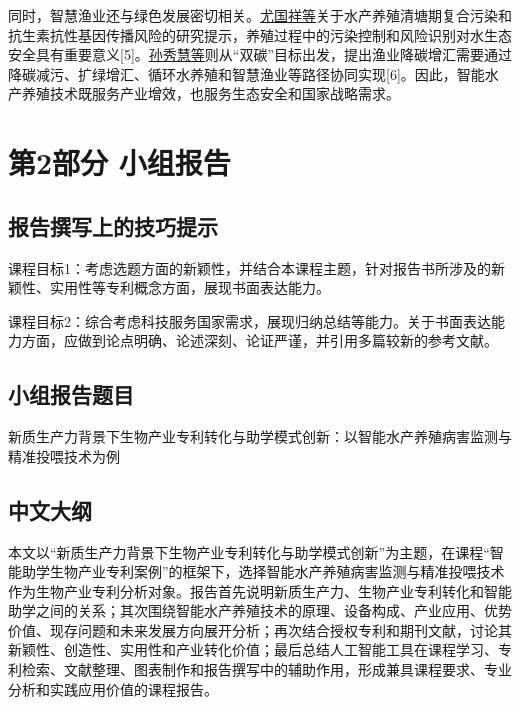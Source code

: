 \documentclass[UTF8,zihao=-4]{ctexart}
\begin{document}
	同时，智慧渔业还与绿色发展密切相关。\href{https://kns.cnki.net/}{尤国祥等}关于水产养殖清塘期复合污染和抗生素抗性基因传播风险的研究提示，养殖过程中的污染控制和风险识别对水生态安全具有重要意义[5]。\href{https://kns.cnki.net/}{孙秀慧等}则从“双碳”目标出发，提出渔业降碳增汇需要通过降碳减污、扩绿增汇、循环水养殖和智慧渔业等路径协同实现[6]。因此，智能水产养殖技术既服务产业增效，也服务生态安全和国家战略需求。
	
	\newpage
	
	\section*{第2部分 小组报告}
	
	\subsection*{报告撰写上的技巧提示}
	
	课程目标1：考虑选题方面的新颖性，并结合本课程主题，针对报告书所涉及的新颖性、实用性等专利概念方面，展现书面表达能力。
	
	课程目标2：综合考虑科技服务国家需求，展现归纳总结等能力。关于书面表达能力方面，应做到论点明确、论述深刻、论证严谨，并引用多篇较新的参考文献。
	
	\subsection*{小组报告题目}
	
	新质生产力背景下生物产业专利转化与助学模式创新：以智能水产养殖病害监测与精准投喂技术为例
	
	\subsection*{中文大纲}
	
	本文以“新质生产力背景下生物产业专利转化与助学模式创新”为主题，在课程“智能助学生物产业专利案例”的框架下，选择智能水产养殖病害监测与精准投喂技术作为生物产业专利分析对象。报告首先说明新质生产力、生物产业专利转化和智能助学之间的关系；其次围绕智能水产养殖技术的原理、设备构成、产业应用、优势价值、现存问题和未来发展方向展开分析；再次结合授权专利和期刊文献，讨论其新颖性、创造性、实用性和产业转化价值；最后总结人工智能工具在课程学习、专利检索、文献整理、图表制作和报告撰写中的辅助作用，形成兼具课程要求、专业分析和实践应用价值的课程报告。
	
\end{document}
